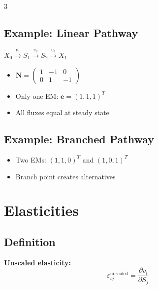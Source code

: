 \documentclass[10pt,landscape,letter]{article}
\begin{document}
\begin{multicols}{3}
\subsection{Example: Linear Pathway}
\begin{center}
$X_0 \xrightarrow{v_1} S_1 \xrightarrow{v_2} S_2 \xrightarrow{v_3} X_1$
\end{center}
\begin{itemize}
\item $\mathbf{N} = \begin{pmatrix} 1 & -1 & 0 \\ 0 & 1 & -1 \end{pmatrix}$
\item Only one EM: $\mathbf{e} = (1, 1, 1)^T$
\item All fluxes equal at steady state
\end{itemize}

\subsection{Example: Branched Pathway}
\begin{center}
\end{center}
\begin{itemize}
\item Two EMs: $(1,1,0)^T$ and $(1,0,1)^T$
\item Branch point creates alternatives
\end{itemize}

\section{Elasticities}

\subsection{Definition}
\textbf{Unscaled elasticity:}
\begin{equation*}
\varepsilon_{ij}^{\text{unscaled}} = \frac{\partial v_i}{\partial S_j}
\end{equation*}


\end{multicols}
\end{document}
